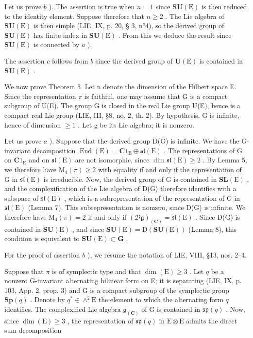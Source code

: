 Let us prove \(b\) ). The assertion is true when \(n = 1\) since \(\mathbf{SU}(\mathrm{E})\) is then reduced to the identity element. Suppose therefore that \(n \geqslant 2\) . The Lie algebra of \(\mathbf{SU}(\mathrm{E})\) is then simple (LIE, IX, p. 20, § 3, n°4), so the derived group of \(\mathbf{SU}(\mathrm{E})\) has finite index in \(\mathbf{SU}(\mathrm{E})\) . From this we deduce the result since \(\mathbf{SU}(\mathrm{E})\) is connected by \(a\) ).

The assertion \(c\) follows from \(b\) since the derived group of \(\mathbf{U}(\mathrm{E})\) is contained in \(\mathbf{SU}(\mathrm{E})\) .

We now prove Theorem 3. Let n denote the dimension of the Hilbert space E. Since the representation \(\pi\) is faithful, one may assume that G is a compact subgroup of U(E). The group G is closed in the real Lie group U(E), hence is a compact real Lie group (LIE, III, §8, no. 2, th. 2). By hypothesis, G is infinite, hence of dimension \(\geqslant 1\) . Let g be its Lie algebra; it is nonzero.

Let us prove \(a\) ). Suppose that the derived group D(G) is infinite. We have the G-invariant decomposition \(\operatorname{End}(\mathrm{E}) = \mathbf{C}1_{\mathrm{E}} \oplus \mathfrak{sl}(\mathrm{E})\) . The representations of G on \(\mathbf{C}1_{\mathrm{E}}\) and on \(\mathfrak{sl}(\mathrm{E})\) are not isomorphic, since \(\dim \mathfrak{sl}(\mathrm{E}) \geqslant 2\) . By Lemma 5, we therefore have \(\mathrm{M}_4(\pi) \geqslant 2\) with equality if and only if the representation of G in \(\mathfrak{sl}(\mathrm{E})\) is irreducible. Now, the derived group of G is contained in \(\mathbf{SL}(\mathrm{E})\) , and the complexification of the Lie algebra of D(G) therefore identifies with a subspace of \(\mathfrak{sl}(\mathrm{E})\) , which is a subrepresentation of the representation of G in \(\mathfrak{sl}(\mathrm{E})\) (Lemma 7). This subrepresentation is nonzero, since D(G) is infinite. We therefore have \(\mathrm{M}_4(\pi) = 2\) if and only if \((\mathcal{D}\mathfrak{g})_{(\mathbf{C})} = \mathfrak{sl}(\mathrm{E})\) . Since D(G) is contained in \(\mathbf{SU}(\mathrm{E})\) , and since \(\mathbf{SU}(\mathrm{E}) = \mathrm{D}(\mathbf{SU}(\mathrm{E}))\) (Lemma 8), this condition is equivalent to \(\mathbf{SU}(\mathrm{E}) \subset \mathbf{G}\) .

For the proof of assertion \(b\) ), we resume the notation of LIE, VIII, §13, nos. 2--4.

Suppose that \(\pi\) is of symplectic type and that \(\dim(\mathrm{E}) \geqslant 3\) . Let \(q\) be a nonzero G-invariant alternating bilinear form on E; it is separating (LIE, IX, p. 103, App. 2, prop. 3) and G is a compact subgroup of the symplectic group \(\mathbf{Sp}(q)\) . Denote by \(q^{*} \in \wedge^{2}\mathrm{E}\) the element to which the alternating form \(q\) identifies. The complexified Lie algebra \(\mathfrak{g}_{(\mathbf{C})}\) of G is contained in \(\mathfrak{sp}(q)\) . Now, since \(\dim(\mathrm{E}) \geqslant 3\) , the representation of \(\mathfrak{sp}(q)\) in \(\mathrm{E} \otimes \mathrm{E}\) admits the direct sum decomposition

